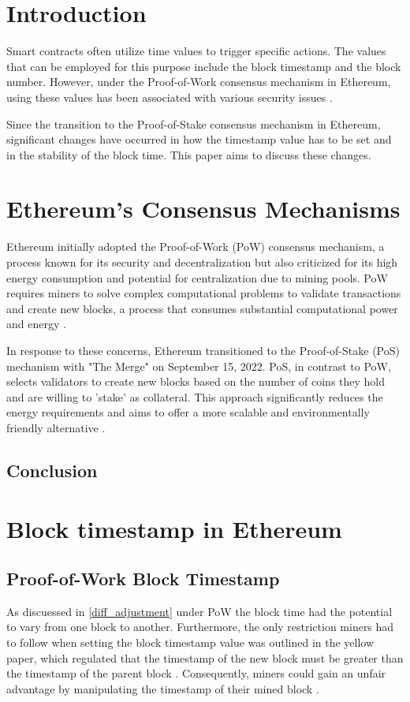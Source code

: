 \section{Introduction}

Smart contracts often utilize time values to trigger specific actions. The
values that can be employed for this purpose include the block timestamp and
the block number. However, under the Proof-of-Work consensus mechanism in
Ethereum, using these values has been associated with various security issues
\cite{swc116} \cite{Conkas2021} \cite{DASP2018} \cite{Osiris2018}
\cite{Oyente2016}.

Since the transition to the Proof-of-Stake consensus mechanism in
Ethereum, significant changes have occurred in how the timestamp value has to
be set and in the stability of the block time. This paper aims to discuss these
changes.

\section{Ethereum's Consensus Mechanisms}
Ethereum initially adopted the Proof-of-Work (PoW) consensus mechanism, a process known
for its security and decentralization but also criticized for its high energy
consumption and potential for centralization due to mining pools. PoW requires
miners to solve complex computational problems to validate transactions and
create new blocks, a process that consumes substantial computational power and
energy \cite{eth_pow}.

In response to these concerns, Ethereum transitioned to the Proof-of-Stake
(PoS) mechanism with "The Merge" on September 15, 2022. PoS, in contrast to
PoW, selects validators to create new blocks based on the number of coins they
hold and are willing to 'stake' as collateral. This approach significantly
reduces the energy requirements and aims to offer a more scalable and
environmentally friendly alternative \cite{eth_merge}.



\subsection{Conclusion}


\section{Block timestamp in Ethereum}
\subsection{Proof-of-Work Block Timestamp}
As discuessed in \ref{diff_adjustment} under PoW the block time had the
potential to vary from one block to another. Furthermore, the only restriction
miners had to follow when setting the block timestamp value was outlined in the
yellow paper, which regulated that the timestamp of the new block must be
greater than the timestamp of the parent block \cite{ethyellowpaper2023}.
Consequently, miners could gain an unfair advantage by manipulating the
timestamp of their mined block \cite{swc116}.

